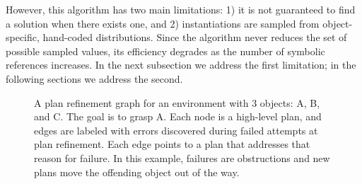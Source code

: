 However, this algorithm has two
main limitations: 1) it is not guaranteed to find a solution when
there exists one, and 2) instantiations
are sampled from object-specific, hand-coded distributions. Since the algorithm
never reduces the set of possible sampled values, its
efficiency degrades as the number of symbolic references increases. In the next subsection
we address the first limitation; in the following sections we address the second.

\begin{figure}[t]
  \vspace{0.5em}
  \centering
  \caption{\small{A plan refinement graph for an environment with 3
      objects: A, B, and C. The goal is to grasp A. Each node is a
      high-level plan, and edges are labeled with errors discovered during
      failed attempts at plan refinement. Each edge points to a plan
      that addresses that reason for failure. In this example, failures
      are obstructions and new plans move the offending object out of
      the way.}}
  \label{fig:prg}
\end{figure}

